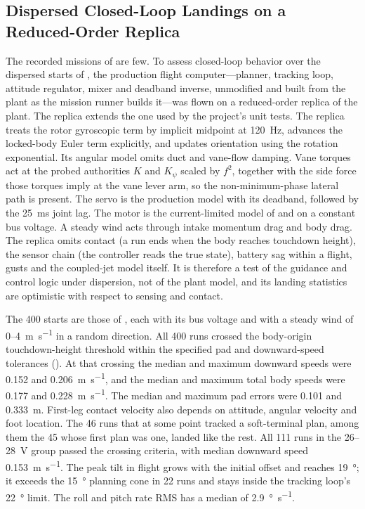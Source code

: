 \documentclass[10pt,letterpaper]{article}
\begin{document}
\subsection{Dispersed Closed-Loop Landings on a Reduced-Order Replica}
\label{sec:results-closedloop}

The recorded missions of  are few.
To assess closed-loop behavior over the dispersed starts of , the production flight computer---planner, tracking loop, attitude regulator, mixer and deadband inverse, unmodified and built from the plant as the mission runner builds it---was flown on a reduced-order replica of the plant.
The replica extends the one used by the project's unit tests.
The replica treats the rotor gyroscopic term by implicit midpoint at \SI{120}{\hertz}, advances the locked-body Euler term explicitly, and updates orientation using the rotation exponential. Its angular model omits duct and vane-flow damping.
Vane torques act at the probed authorities $K$ and $K_\psi$ scaled by $f^2$, together with the side force those torques imply at the vane lever arm, so the non-minimum-phase lateral path is present.
The servo is the production model with its deadband, followed by the \SI{25}{\milli\second} joint lag.
The motor is the current-limited model of  and  on a constant bus voltage.
A steady wind acts through intake momentum drag and body drag.
The replica omits contact (a run ends when the body reaches touchdown height), the sensor chain (the controller reads the true state), battery sag within a flight, gusts and the coupled-jet model itself.
It is therefore a test of the guidance and control logic under dispersion, not of the plant model, and its landing statistics are optimistic with respect to sensing and contact.

The 400 starts are those of , each with its bus voltage and with a steady wind of 0--\SI{4}{\metre\per\second} in a random direction.
All 400 runs crossed the body-origin touchdown-height threshold within the specified pad and downward-speed tolerances ().
At that crossing the median and maximum downward speeds were 0.152 and \SI{0.206}{\metre\per\second}, and the median and maximum total body speeds were 0.177 and \SI{0.228}{\metre\per\second}. The median and maximum pad errors were 0.101 and \SI{0.333}{\metre}. First-leg contact velocity also depends on attitude, angular velocity and foot location.
The 46 runs that at some point tracked a soft-terminal plan, among them the 45 whose first plan was one, landed like the rest.
All 111 runs in the 26--\SI{28}{\volt} group passed the crossing criteria, with median downward speed \SI{0.153}{\metre\per\second}.
The peak tilt in flight grows with the initial offset and reaches \SI{19}{\degree}; it exceeds the \SI{15}{\degree} planning cone in 22 runs and stays inside the tracking loop's \SI{22}{\degree} limit.
The roll and pitch rate RMS has a median of \SI{2.9}{\degree\per\second}.
\end{document}
